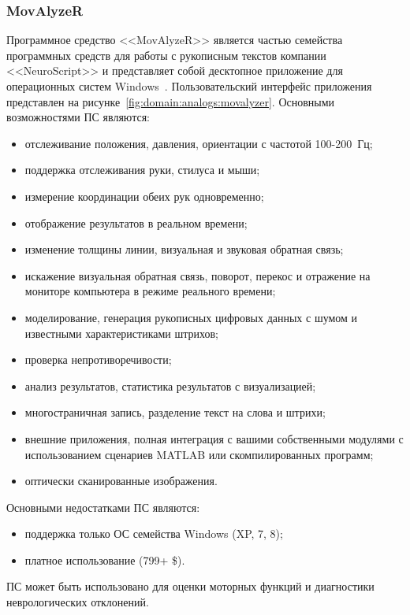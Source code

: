 \subsubsection{MovAlyzeR}
\label{sub:domain:analogs:movalyzer}
Программное средство <<MovAlyzeR>> является частью семейства программных средств для работы с рукописным текстов компании <<NeuroScript>> и представляет собой десктопное приложение для операционных систем Windows~\cite{analogs_movalyzer}. Пользовательский интерфейс приложения представлен на рисунке~\ref{fig:domain:analogs:movalyzer}.
Основными возможностями ПС являются:
\begin{itemize}
  \item отслеживание положения, давления, ориентации с частотой \mbox{100-200 Гц;}
  \item поддержка отслеживания руки, стилуса и мыши;
  \item измерение координации обеих рук одновременно;
  \item отображение результатов в реальном времени;
  \item изменение толщины линии, визуальная и звуковая обратная связь;
  \item искажение визуальная обратная связь, поворот, перекос и отражение на мониторе компьютера в режиме реального времени;
  \item моделирование, генерация рукописных цифровых данных с шумом и известными характеристиками штрихов;
  \item проверка непротиворечивости;
  \item анализ результатов, статистика результатов с визуализацией;
  \item многостраничная запись, разделение текст на слова и штрихи;
  \item внешние приложения, полная интеграция с вашими собственными модулями с использованием сценариев MATLAB или скомпилированных программ;
  \item оптически сканированные изображения.
\end{itemize}

Основными недостатками ПС являются:
\begin{itemize}
  \item поддержка только ОС семейства Windows (XP, 7, 8);
  \item платное использование (799+ \$).
\end{itemize}

ПС может быть использовано для оценки моторных функций и диагностики неврологических отклонений.

